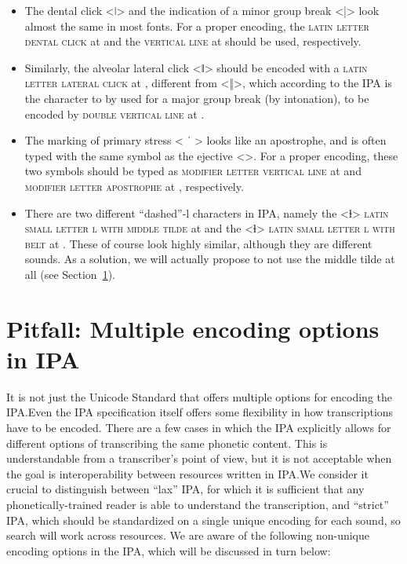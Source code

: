 \begin{itemize}
  
   \item The dental click <ǀ> and the indication of a minor group break <|>
           look almost the same in
           most fonts. For a proper encoding, the \textsc{latin letter dental
           click} at  and the \textsc{vertical line }at  
           should be used, respectively.
   \item Similarly, the alveolar lateral click <ǁ>	should be encoded with a
           \textsc{latin letter lateral click} at , different from <‖>, 
           which according to the IPA is the character to by used for a major group 
           break (by intonation), to be encoded by \textsc{double vertical line} 
           at .
   \item The marking of primary stress < ˈ > looks like an apostrophe, and
           is often typed with the same symbol as the ejective <>. For a
           proper encoding, these two symbols should be typed as 
           \textsc{modifier letter vertical line} at  and
           \textsc{modifier letter apostrophe} at , respectively. 
   \item There are two different ``dashed''-l characters in IPA, namely the <ɫ> 	      \textsc{latin small letter l with middle tilde} at  and the <ɬ>	      \textsc{latin small letter l with belt} at . These of course
          look highly similar, although they are different sounds. As a solution, 
          we will actually propose to not use the middle tilde at all 
          (see Section~\ref{pitfall-multiple-options-ipa}).     
   
\end{itemize}

\section{Pitfall: Multiple encoding options in IPA}
\label{pitfall-multiple-options-ipa}     

It is not just the Unicode Standard that offers multiple options for encoding
the IPA.\@ Even the IPA specification itself offers some flexibility in how
transcriptions have to be encoded. There are a few cases in which the IPA
explicitly allows for different options of transcribing the same phonetic
content. This is understandable from a transcriber's point of view, but it is
not acceptable when the goal is interoperability between resources written in
IPA.\@ We consider it crucial to distinguish between ``lax'' IPA, for which it
is sufficient that any phonetically-trained reader is able to understand the
transcription, and ``strict'' IPA, which should be standardized on a single
unique encoding for each sound, so search will work across resources. We are
aware of the following non-unique encoding options in the IPA, which will be
discussed in turn below:

